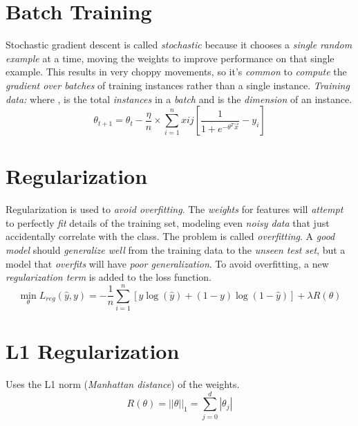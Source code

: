 \documentclass[
	exam={Midterm}
]{cs584exam}
\begin{document}
\section{Batch Training}\label{sec:batch-training}
Stochastic gradient descent is called \emph{stochastic} because it chooses a \emph{single random example} at a time, moving the weights to improve performance on that single example.
This results in very choppy movements, so it's \emph{common} to \emph{compute} the \emph{gradient over batches} of training instances rather than a single instance.
\emph{Training data: }  where ,  is the total \emph{instances} in a \emph{batch} and  is the \emph{dimension} of an instance.
\begin{equation}
	\theta_{t+1} = \theta_{t} - \frac{\eta}{n} \times \sum_{i=1}^{n} xij \left[ \frac{1}{1 + e^{-\theta^{T}\vec{x}}} - y_{i} \right]
	\label{eq:batch-training}
\end{equation}

\section{Regularization}\label{sec:regularization}
Regularization is used to \emph{avoid overfitting}.
The \emph{weights} for features will \emph{attempt} to perfectly \emph{fit} details of the training set, modeling even \emph{noisy data} that just accidentally correlate with the class.
The problem is called \emph{overfitting}.
A \emph{good model} should \emph{generalize well} from the training data to the \emph{unseen test set}, but a model that \emph{overfits} will have \emph{poor generalization}.
To avoid overfitting, a new \emph{regularization term}  is added to the loss function.
\begin{equation}
	\min_{\theta} L_{reg}(\hat{y}, y) = -\frac{1}{n} \sum_{i=1}^{n} \left[ y\log(\hat{y}) + (1 - y)\log(1 - \hat{y}) \right] + \lambda R(\theta)
	\label{eq:regulatization}
\end{equation}

\section{L1 Regularization}\label{sec:l1-regularization}
Uses the L1 norm (\emph{Manhattan distance}) of the weights.
\begin{equation}[eqred]
	R(\theta) = ||\theta||_{1} = \sum_{j=0}^{d} |\theta_{j}|
\label{eq:l1-regulatization}
\end{equation}
\end{document}
